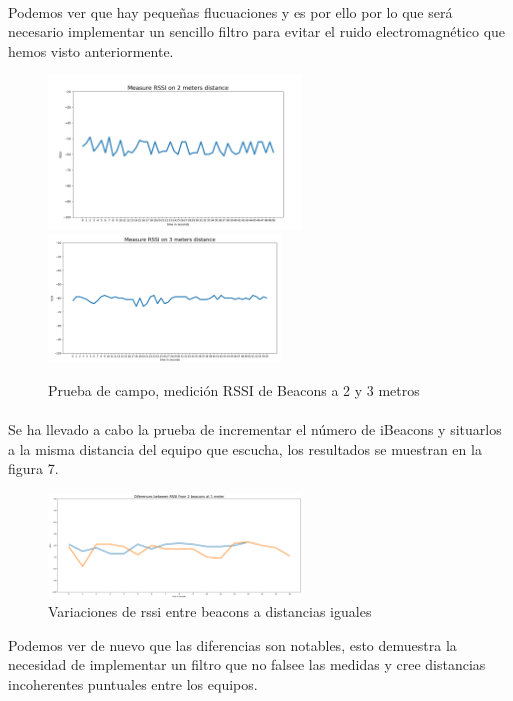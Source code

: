\documentclass[a4paper ,12pt, onecolumn]{article}
\begin{document}
            \paragraph{}
            Podemos ver que hay pequeñas flucuaciones y es por ello por lo que será necesario implementar un sencillo filtro para
            evitar el ruido electromagnético que hemos visto anteriormente.
            \begin{center}
                \begin{figure}[ht]
                    \centering
                    \includegraphics[width=0.6\textwidth]{1_beacon_2_meters.PNG}
                    \includegraphics[width=0.55\textwidth]{1_beacon_3_meters.PNG}
                    \caption{Prueba de campo, medición RSSI de Beacons a 2 y 3 metros}
                    \label{fig:mesh5}
                \end{figure}
            \end{center}
            \paragraph{}
            Se ha llevado a cabo la prueba de incrementar el número de iBeacons y situarlos a la misma distancia del 
            equipo que escucha, los resultados se muestran en la figura 7.
            \begin{center}
                \begin{figure}[ht]
                    \centering
                    \includegraphics[width=0.6\textwidth]{10min_2beacons_same_distance.PNG}
                    \caption{Variaciones de rssi entre beacons a distancias iguales}
                    \label{fig:mesh6}
                \end{figure}
            \end{center}
            Podemos ver de nuevo que las diferencias son notables, esto demuestra la necesidad de implementar
            un filtro que no falsee las medidas y cree distancias incoherentes puntuales entre los equipos.
\end{document}
